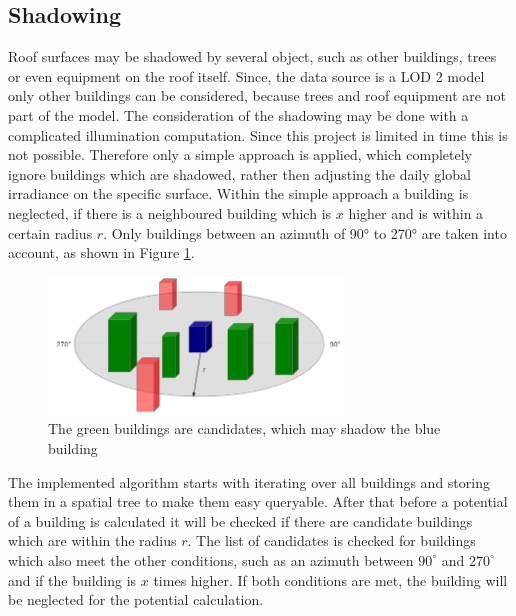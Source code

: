 \subsection{Shadowing}
\label{sec:shadowing}
Roof surfaces may be shadowed by several object, such as other buildings, trees or even equipment on the roof itself. Since, the data source is a LOD 2 model only other buildings can be considered, because trees and roof equipment are not part of the model. The consideration of the shadowing may be done with a complicated illumination computation. Since this project is limited in time this is not possible. Therefore only a simple approach is applied, which completely ignore buildings which are shadowed, rather then adjusting the daily global irradiance on the specific surface.
Within the simple approach a building is neglected, if there is a neighboured building which is $x$ higher and is within a certain radius $r$. Only buildings between an azimuth of 90° to 270° are taken into account, as shown in Figure \ref{fig:shadow}.

\begin{figure}[ht]
	\centering
	\includegraphics[width=0.7\textwidth]{phase2/group2/figure/fig_shadow.png}
	\caption{The green buildings are candidates, which may shadow the blue building}
	\label{fig:shadow}
\end{figure}

The implemented algorithm starts with iterating over all buildings and storing them in a spatial tree to make them easy queryable. After that before a potential of a building is calculated it will be checked if there are candidate buildings which are within the radius $r$. The list of candidates is checked for buildings which also meet the other conditions, such as an azimuth between $90^\circ$ and $270^\circ$ and if the building is $x$ times higher. If both conditions are met, the building will be neglected for the potential calculation. 